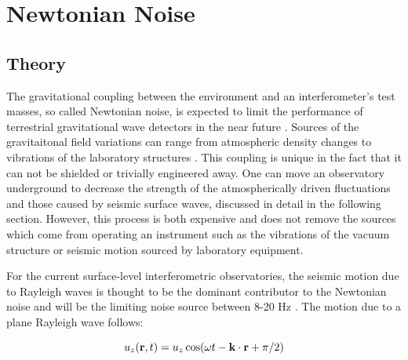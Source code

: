 \documentclass [12pt, proquest]{uwthesis}[2019]
\begin{document}
%

\section{Newtonian Noise}
\subsection{Theory}

The gravitational coupling between the environment and an interferometer's test masses, so called Newtonian noise, is expected to limit the performance of terrestrial gravitational wave detectors in the near future \cite{Saulson}. Sources of the gravitaitonal field variations can range from atmospheric density changes to vibrations of the laboratory structures \cite{terrestrial}. This coupling is unique in the fact that it can not be shielded or trivially engineered away. One can move an observatory underground to decrease the strength of the atmospherically driven fluctuations and those caused by seismic surface waves, discussed in detail in the following section. However, this process is both expensive and does not remove the sources which come from operating an instrument such as the vibrations of the vacuum structure or seismic motion sourced by laboratory equipment. 

For the current surface-level interferometric observatories, the seismic motion due to Rayleigh waves is thought to be the dominant contributor to the Newtonian noise and will be the limiting noise source between 8-20 Hz \cite{NN2}. The motion due to a plane Rayleigh wave follows:

\begin{equation}
u_z({\bf r} ,t)=u_z \cos(\omega t-{\bf k}\cdot{\bf r}+\pi/2) \label{uz}
\end{equation}
\end{document}
